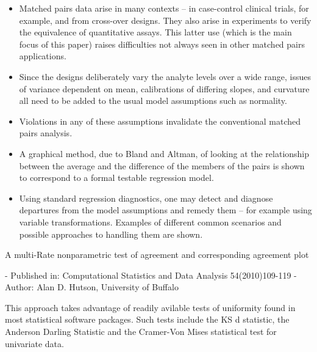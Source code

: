 \documentclass[12pt, a4paper]{report}
\begin{document}
\begin{itemize}
	\item Matched pairs data arise in many contexts – in case-control clinical trials, for example, and from cross-over designs. They also arise in experiments to verify the equivalence of quantitative assays. This latter use (which is the main focus of this paper) raises difficulties not always seen in other matched pairs applications. 
	
	\item Since the designs deliberately vary the analyte levels over a wide range, issues of variance dependent on mean, calibrations of differing slopes, and curvature all need to be added to the usual model assumptions such as normality. 
	
	\item Violations in any of these assumptions invalidate the conventional matched pairs analysis. 
	
	\item A graphical method, due to Bland and Altman, of looking at the relationship between the average and the difference of the members of the pairs is shown to correspond to a formal testable regression model. 
	
	\item Using standard regression diagnostics, one may detect and diagnose departures from the model assumptions and remedy them – for example using variable transformations. Examples of different common scenarios and possible approaches to handling them are shown.
\end{itemize}



A multi-Rate nonparametric test of agreement and corresponding agreement plot

- Published in: Computational Statistics and Data Analysis 54(2010)109-119
- Author: Alan D. Hutson, University of Buffalo



This approach takes advantage of readily avilable tests of uniformity found in most statistical software packages.
Such tests include the KS d statistic, the Anderson Darling Statistic and the Cramer-Von Mises statistical test for univariate data.
\end{document}
